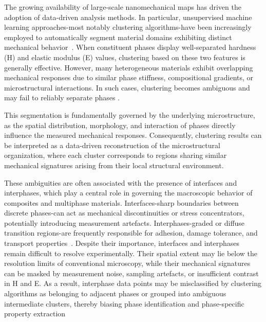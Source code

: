 \documentclass[final,3p,times]{elsarticle}
\begin{document}
The growing availability of large-scale nanomechanical maps has driven the adoption of data-driven analysis methods. In particular, unsupervised machine learning approaches-most notably clustering algorithms-have been increasingly employed to automatically segment material domains exhibiting distinct mechanical behavior~\cite{mercier_tridimap_2018, mercier_microstructural_2019, bernachy-barbe_data_2019, chen_clustering_2021, giolando_ai-dente_2023, jentner_unsupervised_2023, zhang_unsupervised_2024}. When constituent phases display well-separated hardness (H) and elastic modulus (E) values, clustering based on these two features is generally effective. However, many heterogeneous materials exhibit overlapping mechanical responses due to similar phase stiffness, compositional gradients, or microstructural interactions. In such cases, clustering becomes ambiguous and may fail to reliably separate phases \cite{Constantinides2006, Ulm2019, alizade_comparative_2024}.

This segmentation is fundamentally governed by the underlying microstructure, as the spatial distribution, morphology, and interaction of phases directly influence the measured mechanical responses. Consequently, clustering results can be interpreted as a data-driven reconstruction of the microstructural organization, where each cluster corresponds to regions sharing similar mechanical signatures arising from their local structural environment.

These ambiguities are often associated with the presence of interfaces and interphases, which play a central role in governing the macroscopic behavior of composites and multiphase materials. Interfaces-sharp boundaries between discrete phases-can act as mechanical discontinuities or stress concentrators, potentially introducing measurement artefacts. Interphases-graded or diffuse transition regions-are frequently responsible for adhesion, damage tolerance, and transport properties~\cite{hausild_statistical_2019, hodzic_nano-indentation_2000, hausild_determination_2016}. Despite their importance, interfaces and interphases remain difficult to resolve experimentally. Their spatial extent may lie below the resolution limits of conventional microscopy, while their mechanical signatures can be masked by measurement noise, sampling artefacts, or insufficient contrast in H and E. As a result, interphase data points may be misclassified by clustering algorithms as belonging to adjacent phases or grouped into ambiguous intermediate clusters, thereby biasing phase identification and phase-specific property extraction~\cite{mercier_microstructural_2019, konstantopoulos_classification_2020, alizade_comparative_2024, ortizmembrado_2025}
\end{document}
